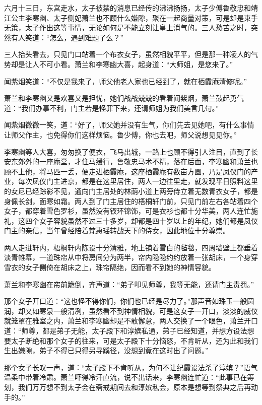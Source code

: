 六月十三日，东宫走水，太子被禁的消息已经传的沸沸扬扬，太子少傅鲁敬忠和靖江公主李寒幽、太子侧妃萧兰也不顾什么嫌隙，聚在一起商量对策，可是却是束手无策，太子作出这等事情，无论如何是不能立刻让皇上消气的。三人愁苦之时，突然有人笑道：“怎么，遇到难题了么？”

三人抬头看去，只见门口站着一个布衣女子，虽然相貌平平，但是那一种凌人的气势却是让人不可小看。萧兰和李寒幽大喜，起身道：“大师姐，是您来了。”

闻紫烟笑道：“不仅是我来了，师父他老人家也已经到了，就在栖霞庵清修呢。”

萧兰和李寒幽又是欢喜又是担忧，她们战战兢兢的看着闻紫烟，萧兰鼓起勇气道：“我们办事不利，门主若是怪罪下来，还请师姐为我们美言几句。”

闻紫烟微微一笑，道：“好了，师父她并没有生气，你们先去见她吧，有什么事情让师父作主，也免得你们这样烦恼。鲁少傅，你也去吧，师父说想见见你。”

李寒幽等人大喜，匆匆换了便衣，飞马出城，一路上也顾不得引人注目，直到了长安东郊外的一座庵堂，才住马缓行，鲁敬忠马术不精，落在后面，李寒幽和萧兰也顾不上他，将马匹一丢，便走进栖霞庵，这座栖霞庵有数亩方圆，乃是凤仪门的产业，每次凤仪门主进京，都是在这里居住，两人一边往里走，就发现平日照料这里的女尼已经踪影不见，通向门主居处的林荫小道上两旁侍立着无数青衣女子，都是身佩长剑，面寒如霜。两人到了门主居住的梧桐轩门前，只见门前左右各站着四个女子，都穿着雪色罗衫，虽然没有钗环锦饰，可是衣衫也都十分华美，两人连忙施礼，这四个女子容貌虽然不过三十多岁，却都是四十岁以上的年纪，她们都是凤仪门主的亲信，当年曾经陪着梵惠瑶转战天下的侍女，因此地位十分尊崇。

两人走进轩内，梧桐轩内陈设十分清雅，地上铺着雪白的毡毯，四周墙壁上都垂着淡青帷幕，一道珠帘从中将房间分为两半，帘内隐隐约约放着一张胡床，一个身穿雪衣的女子侧倚在胡床之上，珠帘隔绝，因而看不到她的神情容貌。

萧兰和李寒幽在帘前跪倒，齐声道：“弟子叩见师尊，我等无能，还请门主责罚。”

那个女子开口道：“这也怪不得你们，你们也已经是尽力了。”那声音如珠玉一般圆润，却又如寒泉一般清冽，虽然看不到神情相貌，可是这女子一开口，淡淡的威仪就笼罩在雅室之内，萧兰和李寒幽却是不敢懈怠，两人交换了一个眼色，萧兰开口道：“师尊，都是弟子无能，太子殿下和淳嫔私通，弟子已经知道，并想方设法想要太子断绝和那个女子的往来，可是太子殿下十分恼怒，不肯听从，还为此和我们生出嫌隙，弟子不得已只得另寻蹊径，没想到竟在这时出了问题。”

那个女子长叹一声，道：“太子殿下不肯听从，为何不让纪霞设法杀了淳嫔？”语气温柔中带着冷肃。萧兰吓得冷汗直流，说不出话来，李寒幽连忙道：“此事已在筹划，我们万万想不到太子会在斋戒期间去和淳嫔私会，原本是想等到祭典之后再动手的。”

